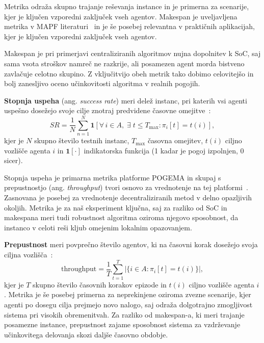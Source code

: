 \documentclass[sigconf,nonacm]{acmart}
\begin{document}
Metrika odraža skupno trajanje reševanja instance in je primerna za scenarije, kjer je ključen vzporedni zaključek vseh agentov. Makespan je 
uveljavljena metrika v MAPF literaturi~\cite{stern2019multiagent} in je še posebej relevantna v praktičnih aplikacijah, kjer je ključen vzporedni 
zaključek vseh agentov. 

Makespan je pri primerjavi centraliziranih algoritmov nujna dopolnitev k SoC, saj sama vsota stroškov namreč ne razkrije, ali posamezen agent 
morda bistveno zavlačuje celotno skupino. Z vključitvijo obeh metrik tako dobimo celovitejšo in bolj zanesljivo oceno učinkovitosti algoritma v realnih pogojih.

\vspace{0.5em}
\noindent
\textbf{Stopnja uspeha} (ang. \textit{success rate}) meri delež instanc, pri katerih vsi
agenti uspešno dosežejo svoje cilje znotraj predvidene časovne
omejitve~\cite{skrynnik2025pogema}:
\[
    SR = \frac{1}{N}\sum_{n=1}^{N}
    \mathbf{1}\!\left[\forall\,i\in A,\;\exists\;t\le T_{\max}:\pi_i[t]=t(i)\right],
\]
kjer je $N$ skupno število testnih instanc, $T_{\max}$ časovna omejitev, $t(i)$ ciljno
vozlišče agenta $i$ in $\mathbf{1}[\cdot]$ indikatorska funkcija (1 kadar je pogoj
izpolnjen, 0 sicer).

Stopnja uspeha je primarna metrika platforme POGEMA in skupaj s prepustnostjo (ang. \textit{throughput}) tvori osnovo za vrednotenje na tej platformi~\cite{skrynnik2025pogema}. 
Zasnovana je posebej za vrednotenje decentraliziranih metod v delno opazljivih okoljih. Metrika je za naš eksperiment ključna, saj za razliko od SoC in makespana meri tudi 
robustnost algoritma oziroma njegovo sposobnost, da instanco v celoti reši kljub omejenim lokalnim opazovanjem.

\vspace{0.5em}
\noindent
\textbf{Prepustnost} meri povprečno število agentov, ki na
časovni korak dosežejo svoja ciljna vozlišča~\cite{skrynnik2025pogema}:
\[
    \text{throughput} = \frac{1}{T}\sum_{t=1}^{T}
    \bigl|\{i\in A : \pi_i[t] = t(i)\}\bigr|,
\]
kjer je $T$ skupno število časovnih korakov epizode in $t(i)$ ciljno vozlišče agenta $i$.
Metrika je še posebej primerna za neprekinjene oziroma zvezne scenarije, 
kjer agenti po dosegu cilja prejmejo novo nalogo, saj odraža 
dolgotrajno zmogljivost sistema pri visokih obremenitvah. 
Za razliko od makespan-a, ki meri trajanje posamezne instance, prepustnost 
zajame sposobnost sistema za vzdrževanje učinkovitega delovanja skozi 
daljše časovno obdobje.
\end{document}
